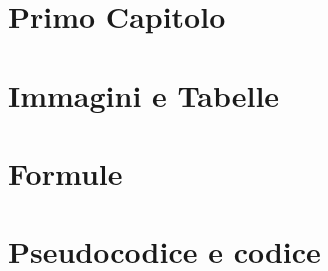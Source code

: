 \thispagestyle{empty} %
\cleardoublepage

\thispagestyle{empty}

\clearpage{\pagestyle{plain}\cleardoublepage}


\clearpage{\pagestyle{plain}\cleardoublepage}
\tableofcontents %

\clearpage{\pagestyle{plain}\cleardoublepage} %


\clearpage{\pagestyle{plain}\cleardoublepage} %
\chapter{Primo Capitolo} %
\label{chapter:primo_capitolo} %

\clearpage{\pagestyle{plain}\cleardoublepage}
\chapter{Immagini e Tabelle} 
\label{chapter:immagini_e_tabelle} 
 

\clearpage{\pagestyle{plain}\cleardoublepage}
\chapter{Formule} 
\label{chapter:formule} 
 

\clearpage{\pagestyle{plain}\cleardoublepage}
\chapter{Pseudocodice e codice} 
\label{chapter:codice} 
 

\clearpage{\pagestyle{plain}\cleardoublepage}


